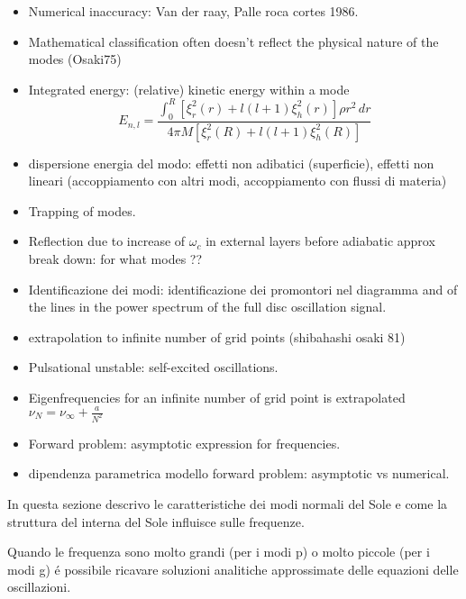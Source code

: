 \documentclass[oneside,12pt,fleqn]{memoir}
\begin{document}
{{\begin{itemize}
    \item Numerical inaccuracy: Van der raay, Palle roca cortes 1986.
    
    \item Mathematical classification often doesn't reflect the physical nature of the modes (Osaki75)
    
    \item Integrated energy: (relative) kinetic energy within a mode
    \begin{equation*}
    E_{n,l}=\frac{\int_0^R[\xi^2_r(r)+l(l+1)\xi_h^2(r)]\rho r^2\,dr}{4\pi M[\xi^2_r(R)+l(l+1)\xi_h^2(R)]}
    \end{equation*}
    
    \item dispersione energia del modo: effetti non adibatici (superficie), effetti non lineari (accoppiamento con altri modi, accoppiamento con flussi di materia)
    
    \item Trapping of modes.
    
    \item Reflection due to increase of $\omega_c$ in external layers before adiabatic approx break down: for what modes ??
    
    
    \item Identificazione dei modi: identificazione dei promontori nel diagramma \dgndi{} and of the lines in the power spectrum of the full disc oscillation signal.
    \item extrapolation to infinite number of grid points (shibahashi osaki 81)
    \item Pulsational unstable: self-excited oscillations.
    \item Eigenfrequencies for an infinite number of grid point is extrapolated $\nu_N=\nu_{\infty}+\frac{a}{N^2}$
    \item Forward problem: asymptotic expression for frequencies.
    \item dipendenza parametrica modello forward problem: asymptotic vs numerical.
\end{itemize}
}

In questa sezione descrivo le caratteristiche dei modi normali del Sole e come la struttura del interna del Sole influisce sulle frequenze.

Quando le frequenza sono molto grandi (per i modi p) o molto piccole (per i modi g) \'e possibile ricavare soluzioni analitiche approssimate delle equazioni delle oscillazioni. 

}
\end{document}
